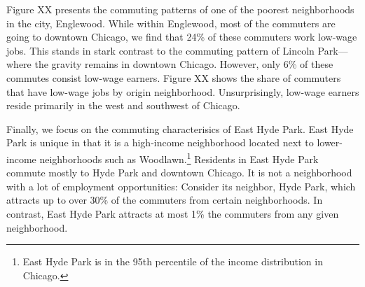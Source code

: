 Figure XX presents the commuting patterns of one of the poorest neighborhoods in the city, Englewood. While within Englewood, most of the commuters are going to downtown Chicago, we find that 24\% of these commuters work low-wage jobs. This stands in stark contrast to the commuting pattern of Lincoln Park---where the gravity remains in downtown Chicago. However, only 6\% of these commutes consist low-wage earners. Figure XX shows the share of commuters that have low-wage jobs by origin neighborhood. Unsurprisingly, low-wage earners reside primarily in the west and southwest of Chicago. 

Finally, we focus on the commuting characterisics of East Hyde Park. East Hyde Park is unique in that it is a high-income neighborhood located next to lower-income neighborhoods such as Woodlawn.\footnote{East Hyde Park is in the 95th percentile of the income distribution in Chicago.} Residents in East Hyde Park commute mostly to Hyde Park and downtown Chicago. It is not a neighborhood with a lot of employment opportunities: Consider its neighbor, Hyde Park, which attracts up to over 30\% of the commuters from certain neighborhoods. In contrast, East Hyde Park attracts at most 1\% the commuters from any given neighborhood. 